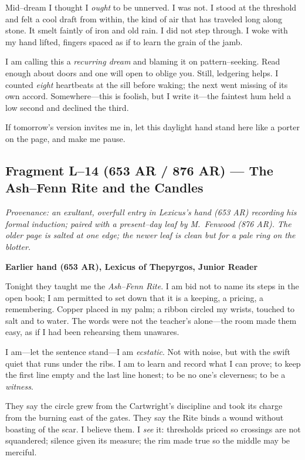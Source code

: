 \documentclass[11pt]{article}
\numberwithin{equation}{section} %
\theoremstyle{plain} %
\theoremstyle{definition} %
\theoremstyle{remark} %
\begin{document}
Mid–dream I thought I \emph{ought} to be unnerved. I was not. I stood at the threshold and felt a cool draft from within, the kind of air that has traveled long along stone. It smelt faintly of iron and old rain. I did not step through. I woke with my hand lifted, fingers spaced as if to learn the grain of the jamb.

I am calling this a \emph{recurring dream} and blaming it on pattern–seeking. Read enough about doors and one will open to oblige you. Still, ledgering helps. I counted \emph{eight} heartbeats at the sill before waking; the next went missing of its own accord. Somewhere—this is foolish, but I write it—the faintest hum held a low second and declined the third.

If tomorrow’s version invites me in, let this daylight hand stand here like a porter on the page, and make me pause.

\bigskip

\subsection{Fragment L--14 (653 AR / 876 AR) — The Ash–Fenn Rite and the Candles}
\label{frag:l14}

\noindent\textit{Provenance: an exultant, overfull entry in Lexicus’s hand (653 AR) recording his formal induction; paired with a present–day leaf by M.\ Fenwood (876 AR). The older page is salted at one edge; the newer leaf is clean but for a pale ring on the blotter.}

\medskip
\noindent\textbf{Earlier hand (653 AR), Lexicus of Thepyrgos, Junior Reader}

Tonight they taught me the \textit{Ash–Fenn Rite}. I am bid not to name its steps in the open book; I am permitted to set down that it is a keeping, a pricing, a remembering. Copper placed in my palm; a ribbon circled my wrists, touched to salt and to water. The words were not the teacher’s alone—the room made them easy, as if I had been rehearsing them unawares.

I am—let the sentence stand—I am \emph{ecstatic}. Not with noise, but with the swift quiet that runs under the ribs. I am to learn and record what I can prove; to keep the first line empty and the last line honest; to be no one’s cleverness; to be a \emph{witness}.

They say the circle grew from the Cartwright’s discipline and took its charge from the burning east of the gates. They say the Rite binds a wound without boasting of the scar. I believe them. I \emph{see} it: thresholds priced so crossings are not squandered; silence given its measure; the rim made true so the middle may be merciful.
\end{document}

